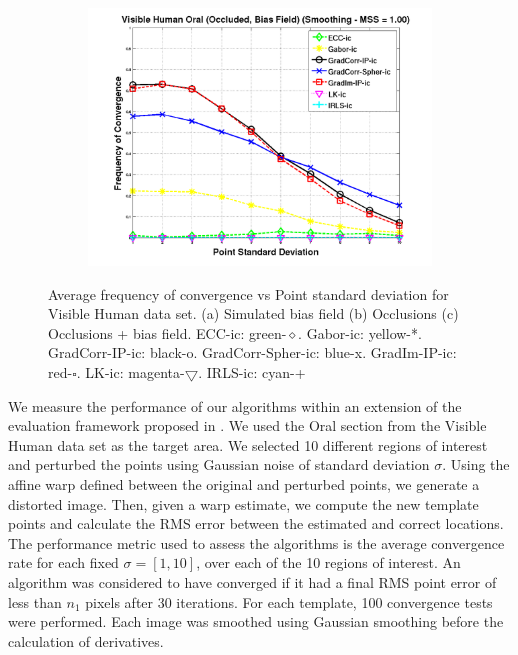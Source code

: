 \begin{figure}[t!]
\begin{subfigure}{0.3\textwidth}
                \subcaption{}
                \label{fig:results-occlusion}
        \end{subfigure}
        \begin{subfigure}{0.3\textwidth}
                \centering
                \includegraphics[width=\textwidth]{images/results/occlusion-biasfield}
                \subcaption{}
                \label{fig:results-occlusion-biasfield}
        \end{subfigure}
        \caption{Average frequency of convergence vs Point standard deviation for Visible Human data set. (a) Simulated bias field (b) Occlusions (c) Occlusions + bias field. ECC-ic: green-$\diamond$. Gabor-ic: yellow-*. GradCorr-IP-ic: black-o. GradCorr-Spher-ic: blue-x. GradIm-IP-ic: red-$\square$. LK-ic: magenta-$\bigtriangledown$. IRLS-ic: cyan-+}
        \label{fig:results-corrupted}
\end{figure}
We measure the performance of our algorithms within an extension of the evaluation framework proposed in \cite{RefWorks:10}. We used the Oral section from the Visible Human data set \cite{RefWorks:81} as the target area. We selected 10 different regions of interest and perturbed the points using Gaussian noise of standard deviation $\sigma$. Using the affine warp defined between the original and perturbed points, we generate a distorted image. Then, given a warp estimate, we compute the new template points and calculate the RMS error between the estimated and correct locations. The performance metric used to assess the algorithms is the average convergence rate for each fixed $\sigma = [1, 10]$, over each of the 10 regions of interest. An algorithm was considered to have converged if it had a final RMS point error of less than $n_1$ pixels after 30 iterations. For each template, 100 convergence tests were performed. Each image was smoothed using Gaussian smoothing before the calculation of derivatives.
